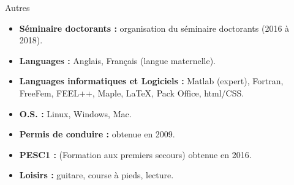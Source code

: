 \documentclass[10pt,a4paper]{report}
\begin{document}
\vspace{0.5cm}
\noindent
{\selectfont
\begin{Large}
Autres
\end{Large}
\hrulefill
}
\vspace{.5cm}

\noindent
\begin{itemize}
\item \textbf{Séminaire doctorants :} organisation du séminaire doctorants (2016 à 2018).
\item \textbf{Languages :} Anglais, Français (langue maternelle).
\item \textbf{Languages informatiques et Logiciels :} Matlab (expert), Fortran, FreeFem, FEEL++, Maple, \LaTeX, Pack Office, html/CSS.
\item \textbf{O.S. :} Linux, Windows, Mac.
\item \textbf{Permis de conduire :} obtenue en 2009.
\item \textbf{PESC1 :} (Formation aux premiers secours) obtenue en 2016.
\item \textbf{Loisirs :} guitare, course à pieds, lecture.

\end{itemize}
\end{document}
